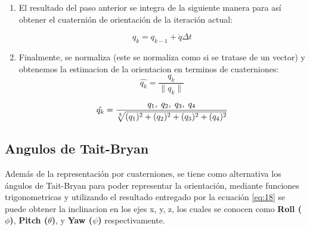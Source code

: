 \documentclass[conference]{IEEEtran}
\providecommand{\norm}[1]{\lVert#1\rVert}
\begin{document}
\begin{enumerate}
        \item El resultado del paso anterior se integra de la siguiente manera para así obtener el cuaternión de orientación de la iteración actual:
        
        \begin{equation}
            q_k = q_{k-1} + \dot{q} \Delta t 
        \end{equation}
    
        \item Finalmente, se normaliza (este se normaliza como si se tratase de un vector) y obtenemos la estimacion de la orientacion en terminos de cuaterniones:
        \begin{equation}
            \hat{q_k} = \frac{q_k}{\norm{q_k}} 
        \end{equation}        
            
        \begin{equation} \label{eq:18}
            \hat{q_k} = \frac{q_1, \hspace{1mm} q_2, \hspace{1mm} q_3, \hspace{1mm} q_4}{\sqrt[2]{(q_1)^2 + (q_2)^2 + (q_3)^2 + (q_4)^2}} 
        \end{equation}
            
    \end{enumerate}

    \subsection{Angulos de Tait-Bryan}

    Además de la representación por cuaterniones, se tiene como alternativa los ángulos de Tait-Bryan para poder representar la orientación, mediante funciones
    trigonometricas y utilizando el resultado entregado por la ecuación \ref{eq:18} se puede obtener la inclinacion en los ejes x, y, z, los cuales se conocen 
    como \textbf{Roll ($ \phi $)}, \textbf{Pitch ($ \theta  $)}, y \textbf{Yaw ($ \psi  $)} respectivamente.
\end{document}
